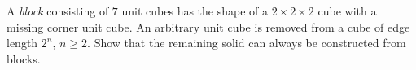 A \emph{block} consisting of $7$ unit cubes has the shape of a $2 \times 2 \times 2$ cube with a
missing corner unit cube. An arbitrary unit cube is removed from a cube of edge
length $2^n$, $n \geq 2$. Show that the remaining solid can always be constructed from blocks.
